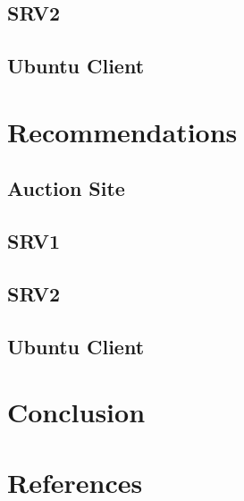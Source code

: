 \documentclass{report}
\begin{document}
\section{SRV2}
\section{Ubuntu Client}

\chapter{Recommendations}
\section{Auction Site}
\section{SRV1}
\section{SRV2}
\section{Ubuntu Client}

\chapter{Conclusion}

\chapter{References}
\end{document}
